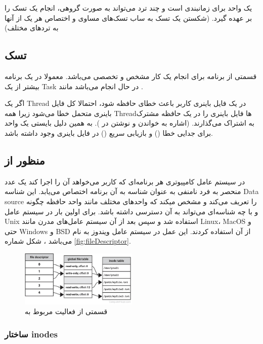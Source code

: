 \documentclass[10pt, a4paper]{article}
\begin{document}
یک واحد برای زمانبندی است و چند ترد می‌تواند به صورت گروهی، انجام یک تسک را بر
عهده گیرد. (شکستن یک تسک به  ساب تسک‌های مساوی و اختصاص هر یک از آنها به تردهای
مختلف)

\subsection{تسک}

قسمتی از برنامه برای انجام یک کار مشخص و تخصصی می‌باشد. معمولا در یک برنامه
بیشتر از یک Task در حال انجام می‌باشد \cite{tizenrtrepo} مانند .

اگر یک Thread در یک فایل باینری کاربر باعث خطای حافظه شود، احتمالا کل فایل‌
باینری متحمل خطا می‌شود زیرا همه Threadها فایل باینری را در یک حافظه مشترک به
اشتراک می‌گذارند. (اشاره به خواندن و نوشتن در ). به همین دلیل
بایستی یک واحد برای جدایی خطا () و بازیابی سریع () در فایل باینری وجود داشته باشد.

\subsection{منظور از }

در سیستم عامل کامپیوتری هر برنامه‌ای که کاربر می‌خواهد آن را اجرا کند یک عدد
منحصر به فرد نامنفی به عنوان شناسه به آن برنامه اختصاص می‌یابد. این شناسه Data
source را تعریف می‌کند و مشخص میکند که واحد‌های مختلف مانند واحد حافظه چگونه و
با چه شناسه‌ای می‌تواند به آن دسترسی داشته باشد.  برای اولین
بار در سیستم عامل Unix استفاده شد و سپس بعد از آن سیستم عامل‌های مدرن مانند
Linux، MacOS و حتی Windows و BSD از آن استفاده کردند. این عمل در سیستم عامل
ویندوز به نام  می‌باشد \cite{filedescriptor}، شکل شماره
\ref{fig:fileDescriptor}.

\begin{figure}[H]
    \centering
    \includegraphics[width=0.5\textwidth]{figs/file_descriptor.png}
    \caption{قسمتی از فعالیت مربوط به }
    \label{fig:filedescriptor}
\end{figure}

\subsubsection{ساختار inodes}
\end{document}
